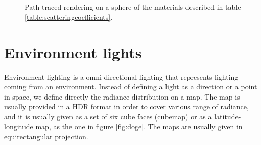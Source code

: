 \begin{figure}
{}
 \\
 \\
\label{fig:examplesmaterials}
\caption{Path traced rendering on a sphere of the materials described in table \ref{table:scatteringcoefficients}.}
\end{figure}
\clearpage

\section{Environment lights}
\label{sec:env}
Environment lighting is a omni-directional lighting that represents lighting coming from an environment. Instead of defining a light as a direction or a point in space, we define directly the radiance distribution on a map. The map is usually provided in a HDR format in order to cover various range of radiance, and it is usually given as a set of six cube faces (cubemap) or as a latitude-longitude map, as the one in figure \ref{fig:doge}. The maps are usually given in equirectangular projection.

